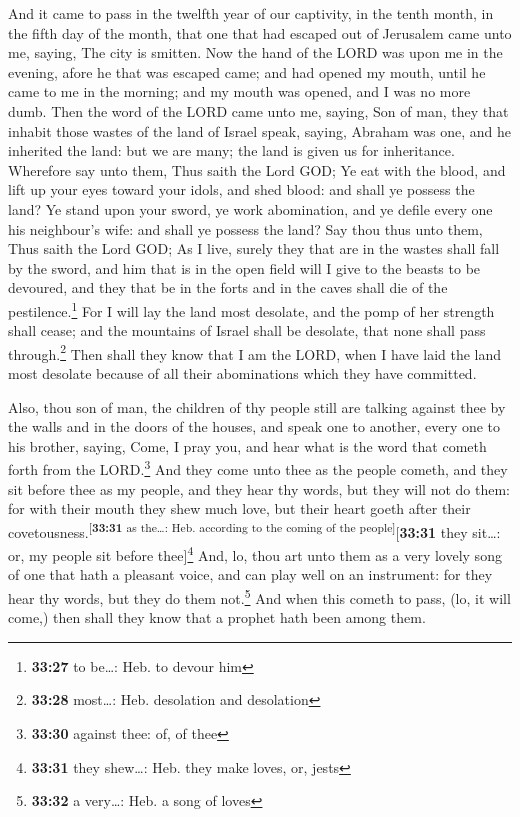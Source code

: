  And it came to pass in the twelfth year of our
captivity, in the tenth month, in the fifth day of the month, that one
that had escaped out of Jerusalem came unto me, saying, The city is
smitten.  Now the hand of the LORD was upon me in the
evening, afore he that was escaped came; and had opened my mouth, until
he came to me in the morning; and my mouth was opened, and I was no more
dumb.  Then the word of the LORD came unto me, saying,
 Son of man, they that inhabit those wastes of the land
of Israel speak, saying, Abraham was one, and he inherited the land: but
we are many; the land is given us for inheritance. 
Wherefore say unto them, Thus saith the Lord GOD; Ye eat with the blood,
and lift up your eyes toward your idols, and shed blood: and shall ye
possess the land?  Ye stand upon your sword, ye work
abomination, and ye defile every one his neighbour's wife: and shall ye
possess the land?  Say thou thus unto them, Thus saith
the Lord GOD; As I live, surely they that are in the wastes shall fall
by the sword, and him that is in the open field will I give to the
beasts to be devoured, and they that be in the forts and in the caves
shall die of the pestilence.\footnote{\textbf{33:27} to be\ldots: Heb.
  to devour him}  For I will lay the land most desolate,
and the pomp of her strength shall cease; and the mountains of Israel
shall be desolate, that none shall pass through.\footnote{\textbf{33:28}
  most\ldots: Heb. desolation and desolation}  Then shall
they know that I am the LORD, when I have laid the land most desolate
because of all their abominations which they have committed.

 Also, thou son of man, the children of thy people still
are talking against thee by the walls and in the doors of the houses,
and speak one to another, every one to his brother, saying, Come, I pray
you, and hear what is the word that cometh forth from the
LORD.\footnote{\textbf{33:30} against thee: of, of thee} 
And they come unto thee as the people cometh, and they sit before thee
as my people, and they hear thy words, but they will not do them: for
with their mouth they shew much love, but their heart goeth after their
covetousness.\textsuperscript{{[}\textbf{33:31} as the\ldots: Heb.
according to the coming of the people{]}}{[}\textbf{33:31} they
sit\ldots: or, my people sit before thee{]}\footnote{\textbf{33:31} they
  shew\ldots: Heb. they make loves, or, jests}  And, lo,
thou art unto them as a very lovely song of one that hath a pleasant
voice, and can play well on an instrument: for they hear thy words, but
they do them not.\footnote{\textbf{33:32} a very\ldots: Heb. a song of
  loves}  And when this cometh to pass, (lo, it will
come,) then shall they know that a prophet hath been among them.

